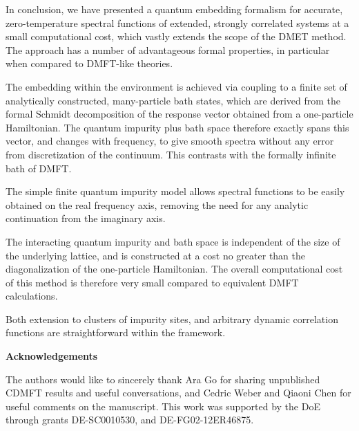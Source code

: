 \documentclass[aps,twocolumn,nobibnotes]{revtex4}
\begin{document}
In conclusion, we have presented a quantum embedding formalism for accurate, zero-temperature spectral functions of extended, strongly correlated systems 
at a small computational cost, which vastly 
extends the scope of the DMET method. The approach has a number of 
advantageous formal properties, in particular when compared to DMFT-like theories. 
\begin{inparaenum}
\item The embedding within the environment is achieved via coupling to a finite set of analytically constructed, many-particle bath states,
    which are derived from the formal Schmidt decomposition of the response vector obtained from a one-particle Hamiltonian.
    The quantum impurity plus bath space therefore exactly spans this vector, and
    changes with frequency, to give smooth spectra without any error from discretization of the continuum. This contrasts with the formally infinite bath of DMFT.
\item The simple finite quantum impurity model allows spectral functions to be easily obtained on the real frequency axis, removing the 
    need for any analytic continuation from the imaginary axis.
\item The interacting quantum impurity and bath space is independent of the size of the underlying lattice, and is constructed at a cost no greater than the
    diagonalization of the one-particle Hamiltonian. The overall computational cost of this method is therefore very small compared to equivalent DMFT calculations.
\item Both extension to clusters of impurity sites, and arbitrary dynamic correlation functions are straightforward within the framework.
\end{inparaenum}

{\bf Acknowledgements}

The authors would like to sincerely thank Ara Go for sharing unpublished CDMFT results and useful 
conversations, and Cedric Weber and Qiaoni Chen for useful comments on the manuscript.
This work was supported by the DoE through grants DE-SC0010530, and DE-FG02-12ER46875.
\end{document}
